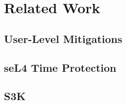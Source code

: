 \section{Related Work}
\label{sec:related_work}


\subsection{User-Level Mitigations}
\label{sub:user_level}


\subsection{seL4 Time Protection}
\label{sub:sel4}


\subsection{S3K}
\label{sub:s3k}


